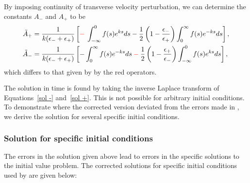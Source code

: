 \documentclass[12pt]{../style-files/ociamthesis}
\begin{document}
By imposing continuity of transverse velocity perturbation, we can determine the constants $A_-$ and $A_+$ to be
\begin{align}
\tilde{A}_+ & = \frac{1}{k(\epsilon_- + \epsilon_+)}\left[\textcolor{red}{-} \: \int_{-\infty}^0 f(s)e^{ks} ds - \frac{1}{2}\left(1 - \frac{\epsilon_-}{\epsilon_+}\right)\int_0^\infty f(s)e^{-ks} ds\right], \\
\tilde{A}_- & = \frac{1}{k(\epsilon_- + \epsilon_+)}\left[-\int_0^\infty f(s)e^{-ks} ds \: \textcolor{red}{-} \: \frac{1}{2}\left(1 - \frac{\epsilon_+}{\epsilon_-}\right)\int_{-\infty}^0 f(s)e^{ks} ds\right],
\end{align}
which differs to that given by \cite{rae_etal81} by the red operators.

The solution in time is found by taking the inverse Laplace transform of Equations~\eqref{sol -} and~\eqref{sol +}. This is not possible for arbitrary initial conditions. To demonstrate where the corrected version deviated from the errors made in \cite{rae_etal81}, we derive the solution for several specific initial conditions.


\subsubsection{Solution for specific initial conditions}

The errors in the solution given above lead to errors in the specific solutions to the initial value problem. The corrected solutions for specific initial conditions used by \cite{rae_etal81} are given below:
\end{document}
